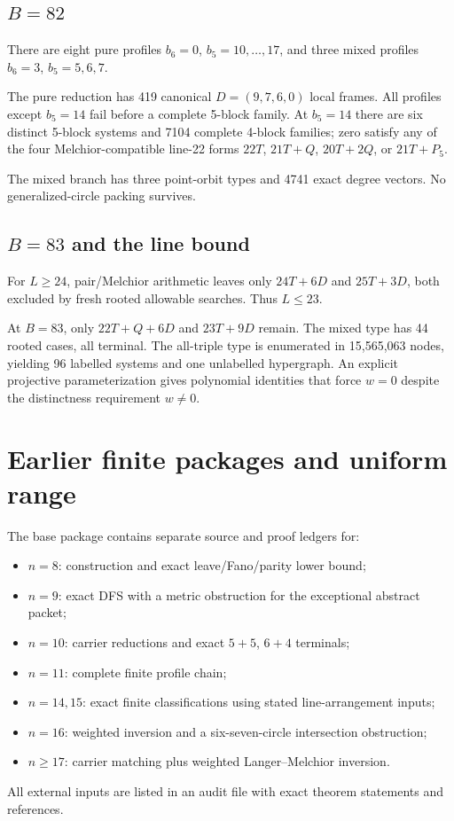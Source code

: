 \documentclass[11pt]{article}
\begin{document}
\subsection{$B=82$}

There are eight pure profiles $b_6=0$, $b_5=10,\ldots,17$, and three mixed profiles $b_6=3$, $b_5=5,6,7$.

The pure reduction has 419 canonical $D=(9,7,6,0)$ local frames.  All profiles except $b_5=14$ fail before a complete 5-block family.  At $b_5=14$ there are six distinct 5-block systems and 7104 complete 4-block families; zero satisfy any of the four Melchior-compatible line-22 forms $22T$, $21T+Q$, $20T+2Q$, or $21T+P_5$.

The mixed branch has three point-orbit types and 4741 exact degree vectors.  No generalized-circle packing survives.

\subsection{$B=83$ and the line bound}

For $L\ge24$, pair/Melchior arithmetic leaves only $24T+6D$ and $25T+3D$, both excluded by fresh rooted allowable searches.  Thus $L\le23$.

At $B=83$, only $22T+Q+6D$ and $23T+9D$ remain.  The mixed type has 44 rooted cases, all terminal.  The all-triple type is enumerated in 15,565,063 nodes, yielding 96 labelled systems and one unlabelled hypergraph.  An explicit projective parameterization gives polynomial identities that force $w=0$ despite the distinctness requirement $w\ne0$.

\section{Earlier finite packages and uniform range}

The base package contains separate source and proof ledgers for:
\begin{itemize}
\item $n=8$: construction and exact leave/Fano/parity lower bound;
\item $n=9$: exact DFS with a metric obstruction for the exceptional abstract packet;
\item $n=10$: carrier reductions and exact $5+5$, $6+4$ terminals;
\item $n=11$: complete finite profile chain;
\item $n=14,15$: exact finite classifications using stated line-arrangement inputs;
\item $n=16$: weighted inversion and a six-seven-circle intersection obstruction;
\item $n\ge17$: carrier matching plus weighted Langer--Melchior inversion.
\end{itemize}
All external inputs are listed in an audit file with exact theorem statements and references.
\end{document}
